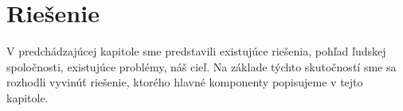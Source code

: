 \section{Riešenie}
V predchádzajúcej kapitole sme predstavili existujúce riešenia, pohľad ľudskej spoločnosti, existujúce problémy, náš cieľ. Na základe týchto skutočností sme sa rozhodli vyvinúť riešenie, ktorého hlavné komponenty popisujeme v tejto kapitole.





